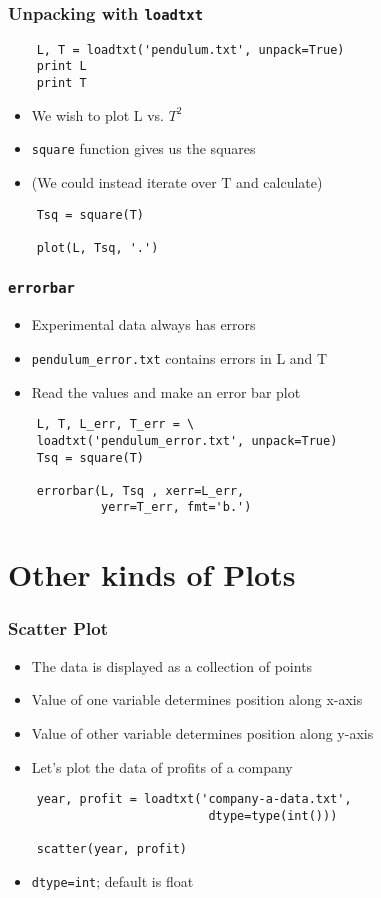 \begin{frame}[fragile]
  \frametitle{Unpacking with \texttt{loadtxt}}
  \begin{lstlisting}
    L, T = loadtxt('pendulum.txt', unpack=True)
    print L
    print T
  \end{lstlisting}
  \begin{itemize}
  \item We wish to plot L vs. $T^2$
  \item \texttt{square} function gives us the squares
  \item (We could instead iterate over T and calculate)
  \end{itemize}
  \begin{lstlisting}
    Tsq = square(T)

    plot(L, Tsq, '.')
  \end{lstlisting}
\end{frame}

\begin{frame}[fragile]
  \frametitle{\texttt{errorbar}}
  \begin{itemize}
  \item Experimental data always has errors
  \item \texttt{pendulum\_error.txt} contains errors in L and T
  \item Read the values and make an error bar plot
  \end{itemize}
  \begin{lstlisting}
    L, T, L_err, T_err = \
    loadtxt('pendulum_error.txt', unpack=True)
    Tsq = square(T)

    errorbar(L, Tsq , xerr=L_err, 
             yerr=T_err, fmt='b.')
  \end{lstlisting}
\end{frame}

\section{Other kinds of Plots}

\begin{frame}[fragile]
  \frametitle{Scatter Plot}
  \begin{itemize}
  \item The data is displayed as a collection of points
  \item Value of one variable determines position along x-axis
  \item Value of other variable determines position along y-axis
  \item Let's plot the data of profits of a company
  \end{itemize}
  \begin{lstlisting}
    year, profit = loadtxt('company-a-data.txt', 
                            dtype=type(int()))

    scatter(year, profit)
  \end{lstlisting}
  \begin{itemize}
  \item \alert{\texttt{dtype=int}; default is float} 
  \end{itemize}
\end{frame}

